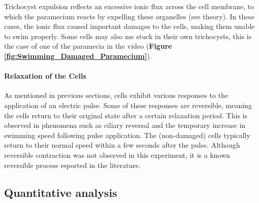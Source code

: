 Trichocyst expulsion reflects an excessive ionic flux across the cell membrane, to which the paramecium reacts by expelling these organelles (see theory). In these cases, the ionic flux caused important damages to the cells, making them unable to swim properly. Some cells may also me stuck in their own trichocysts, this is the case of one of the paramecia in the video (\textbf{Figure \ref{fig:Swimming_Damaged_Paramecium}}).

\paragraph{Relaxation of the Cells}
As mentioned in previous sections, cells exhibit various responses to the application of an electric pulse. Some of these responses are reversible, meaning the cells return to their original state after a certain relaxation period. This is observed in phenomena such as ciliary reversal and the temporary increase in swimming speed following pulse application. The (non-damaged) cells typically return to their normal speed within a few seconds after the pulse. Although reversible contraction was not observed in this experiment, it is a known reversible process reported in the literature.

\subsection{Quantitative analysis}

